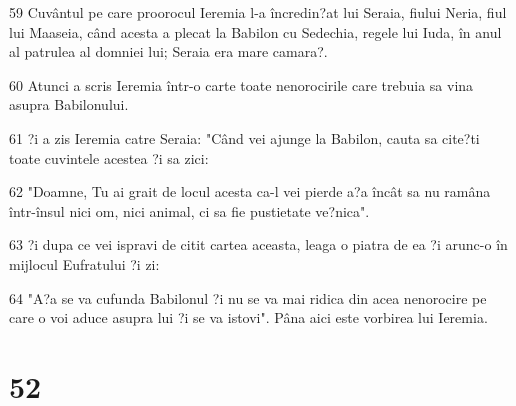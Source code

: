 \par 59 Cuvântul pe care proorocul Ieremia l-a încredin?at lui Seraia, fiului Neria, fiul lui Maaseia, când acesta a plecat la Babilon cu Sedechia, regele lui Iuda, în anul al patrulea al domniei lui; Seraia era mare camara?.
\par 60 Atunci a scris Ieremia într-o carte toate nenorocirile care trebuia sa vina asupra Babilonului.
\par 61 ?i a zis Ieremia catre Seraia: "Când vei ajunge la Babilon, cauta sa cite?ti toate cuvintele acestea ?i sa zici:
\par 62 "Doamne, Tu ai grait de locul acesta ca-l vei pierde a?a încât sa nu ramâna într-însul nici om, nici animal, ci sa fie pustietate ve?nica".
\par 63 ?i dupa ce vei ispravi de citit cartea aceasta, leaga o piatra de ea ?i arunc-o în mijlocul Eufratului ?i zi:
\par 64 "A?a se va cufunda Babilonul ?i nu se va mai ridica din acea nenorocire pe care o voi aduce asupra lui ?i se va istovi". Pâna aici este vorbirea lui Ieremia.

\chapter{52}

